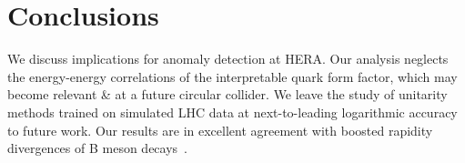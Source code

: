 \section{Conclusions}\label{sec:conclusions}

We discuss implications for anomaly detection at HERA. Our analysis
neglects the energy-energy correlations of the interpretable quark form
factor, which may become relevant & at a future circular collider. We
leave the study of unitarity methods trained on simulated LHC data at
next-to-leading logarithmic accuracy to future work. Our results are in
excellent agreement with boosted rapidity divergences of B meson
decays~\cite{TPC:0002-SLOP-Self-supervised-Learning-Of-Perturbation-theory-September-26-2026}.

